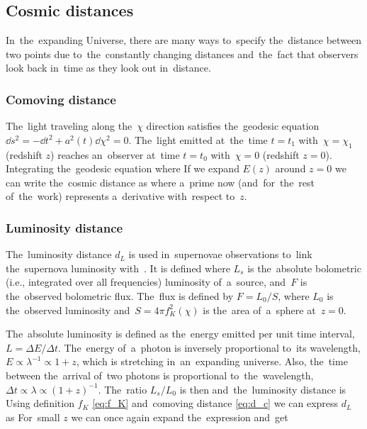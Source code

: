 \DIFaddend \subsection{Cosmic distances}
In~the~expanding Universe, there are many ways to~specify the~distance between two points due to~the~constantly changing distances and~the~fact that observers look back in~time as they look out in~distance.
\subsubsection{Comoving distance}
The~light traveling along the~$\chi$ direction satisfies the~geodesic equation $\dd s^2=-\dd t^2+a^2(t)\dd \chi^2=0$. The~light emitted at~the~time $t=t_1$ with~$\chi=\chi_1$ (redshift $z$) reaches an~observer at~time $t=t_0$ with~$\chi=0$ (redshift $z=0$). Integrating the~geodesic equation
where
If we expand $E(z)$ around $z=0$ we can write the~cosmic distance as
where a~prime now (and~for~the~rest of~the~work) represents a~derivative with~respect to~$z$.
\subsubsection{Luminosity distance}
The~luminosity distance $d_L$ is used in~supernovae observations to~link the~supernova luminosity with~\DIFdelbegin {}\DIFdelend \DIFaddbegin {}\DIFaddend . It is defined \DIFdelbegin {}\DIFdelend \DIFaddbegin {}\parencite{weinberg_observational_2013}
\DIFaddend {}
where $L_s$ is the~absolute bolometric (i.e., integrated over all frequencies) luminosity of~a~source, and~$F$ is the~observed bolometric flux. The~flux is defined by $F=L_0/S$, where $L_0$ is the~observed luminosity and~$S=4\pi f_K^2(\chi)$ is the~area of~a~sphere at~$z=0$.

The~absolute luminosity is defined as the~energy emitted per unit time interval, $L=\Delta E/\Delta t$. The~energy of~a~photon is inversely proportional to~its wavelength, $E\propto\lambda^{-1}\propto 1+z$, which is stretching in~an~expanding universe. Also, the~time between the~arrival of~two photons is proportional to~the~wavelength, $\Delta t\propto\lambda\propto(1+z)^{-1}$. The~ratio $L_s/L_0$ is then
and~the~luminosity distance is
Using definition \(f_K\) \eqref{eq:f_K} and~comoving distance \eqref{eq:d_c} we can express $d_L$ as
For~small $z$ we can once again expand the~expression and~get
